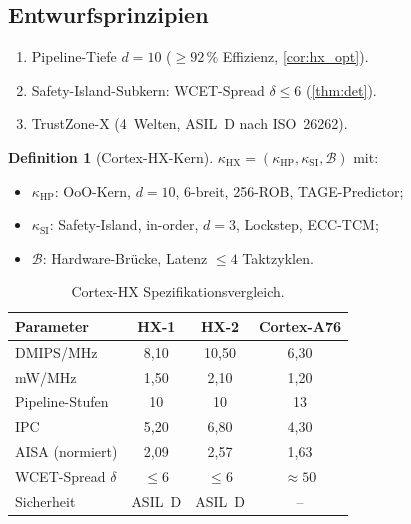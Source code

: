 ﻿\documentclass[a4paper,12pt]{article}
\theoremstyle{plain}
\theoremstyle{definition}
\newtheorem{definition}[theorem]{Definition}
\theoremstyle{remark}
\begin{document}
\subsection{Entwurfsprinzipien}

\begin{enumerate}[label=\textbf{HX-\arabic*.},leftmargin=2.2cm]
  \item Pipeline-Tiefe $d=10$ ($\geq92\,\%$ Effizienz, \cref{cor:hx_opt}).
  \item Safety-Island-Subkern: WCET-Spread $\delta\leq6$ (\cref{thm:det}).
  \item TrustZone-X (4~Welten, ASIL~D nach ISO~26262).
\end{enumerate}

\begin{definition}[Cortex-HX-Kern]\label{def:hx}
$\kappa_\mathrm{HX}=(\kappa_\mathrm{HP},\kappa_\mathrm{SI},\mathcal{B})$ mit:
\begin{itemize}
  \item $\kappa_\mathrm{HP}$: OoO-Kern, $d=10$, 6-breit, 256-ROB, TAGE-Predictor;
  \item $\kappa_\mathrm{SI}$: Safety-Island, in-order, $d=3$, Lockstep, ECC-TCM;
  \item $\mathcal{B}$: Hardware-Br\"ucke, Latenz $\leq4$ Taktzyklen.
\end{itemize}
\end{definition}

\begin{table}[H]
\centering
\caption{Cortex-HX Spezifikationsvergleich.}
\label{tab:hx}
\renewcommand{\arraystretch}{1.3}
\begin{tabular}{lccc}
\toprule
Parameter & HX-1 & HX-2 & Cortex-A76 \\
\midrule
DMIPS/MHz            & 8{,}10  & 10{,}50 & 6{,}30 \\
mW/MHz               & 1{,}50  & 2{,}10  & 1{,}20 \\
Pipeline-Stufen      & 10      & 10      & 13     \\
IPC                  & 5{,}20  & 6{,}80  & 4{,}30 \\
AISA (normiert)      & 2{,}09  & 2{,}57  & 1{,}63 \\
WCET-Spread $\delta$ & $\leq6$ & $\leq6$ & $\approx50$ \\
Sicherheit           & ASIL~D  & ASIL~D  & --     \\
\bottomrule
\end{tabular}
\end{table}
\end{document}
